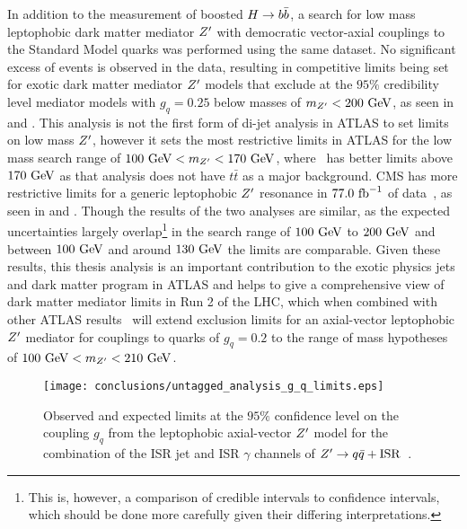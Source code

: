 In addition to the measurement of boosted $H \to b\bar{b}$, a search for low mass leptophobic dark matter mediator $\Zprime$ with democratic vector-axial couplings to the Standard Model quarks was performed using the same dataset.
No significant excess of events is observed in the data, resulting in competitive limits being set for exotic dark matter mediator $\Zprime$ models that exclude at the $95\%$ credibility level mediator models with $g_{q} = 0.25$ below masses of $m_{Z^{\prime}} < 200~\mathrm{GeV}$, as seen in  and .
This analysis is not the first form of di-jet analysis in ATLAS to set limits on low mass $\Zprime$, however it sets the most restrictive limits in ATLAS for the low mass search range of $100~\mathrm{GeV} < m_{Z^{\prime}} <170~\mathrm{GeV}$, where~\cite{EXOT-2017-01} has better limits above $170~\mathrm{GeV}$ as that analysis does not have $t\bar{t}$ as a major background.
CMS has more restrictive limits for a generic leptophobic $\Zprime$ resonance in $77.0~\mathrm{fb}^{-1}$ of data~\cite{CMS:2019hlx}, as seen in  and .
Though the results of the two analyses are similar, as the expected uncertainties largely overlap\footnote{%
 This is, however, a comparison of credible intervals to confidence intervals, which should be done more carefully given their differing interpretations.}
in the search range of $100~\mathrm{GeV}$ to $200~\mathrm{GeV}$ and between $100~\mathrm{GeV}$ and around $130~\mathrm{GeV}$ the limits are comparable.
Given these results, this thesis analysis is an important contribution to the exotic physics jets and dark matter program in ATLAS and helps to give a comprehensive view of dark matter mediator limits in Run 2 of the LHC, which when combined with other ATLAS results~\cite{EXOT-2017-32} will extend exclusion limits for an axial-vector leptophobic $\Zprime$ mediator for couplings to quarks of $g_{q} = 0.2$ to the range of mass hypotheses of $100~\mathrm{GeV} < m_{Z^{\prime}} < 210~\mathrm{GeV}$.

\begin{figure}[htbp]
 \centering
 \texttt{[image: conclusions/untagged\_analysis\_g\_q\_limits.eps]}
 \caption[Observed and expected limits at the $95\%$ confidence level on the coupling $g_{q}$ from the leptophobic axial-vector $\Zprime$ model for the combination of the ISR jet and ISR $\gamma$ channels of $\Zprime \to q\bar{q}+\mathrm{ISR}$.]{%
  Observed and expected limits at the $95\%$ confidence level on the coupling $g_{q}$ from the leptophobic axial-vector $\Zprime$ model for the combination of the ISR jet and ISR $\gamma$ channels of $\Zprime \to q\bar{q}+\mathrm{ISR}$~\cite{EXOT-2017-01}.
 }
 \label{fig:untagged_analysis_g_q_limits}
\end{figure}

